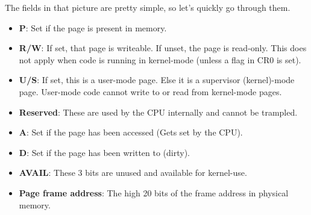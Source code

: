 \documentclass[12pt]{article}
\begin{document}
The fields in that picture are pretty simple, so let's quickly go through them.
\begin{itemize}
  \item \textbf{P}: Set if the page is present in memory.
  \item \textbf{R/W}: If set, that page is writeable. If unset, the page is read-only. This does not apply when code is running in kernel-mode (unless a flag in CR0 is set).
  \item \textbf{U/S}: If set, this is a user-mode page. Else it is a supervisor (kernel)-mode page. User-mode code cannot write to or read from kernel-mode pages.
  \item \textbf{Reserved}: These are used by the CPU internally and cannot be trampled.
  \item \textbf{A}: Set if the page has been accessed (Gets set by the CPU).
  \item \textbf{D}: Set if the page has been written to (dirty).
  \item \textbf{AVAIL}: These 3 bits are unused and available for kernel-use.
  \item \textbf{Page frame address}: The high 20 bits of the frame address in physical memory.
\end{itemize}
\end{document}
